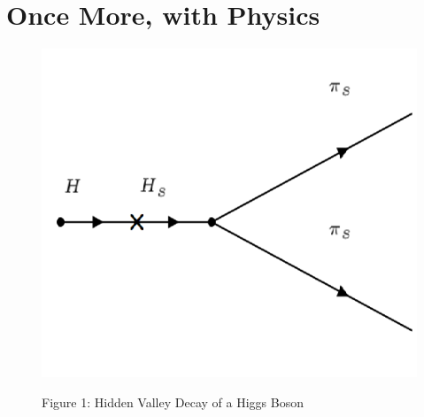 \documentclass[10pt,a4paper]{report}
\begin{document}
\section*{Once More, with Physics}
\begin{figure}
\includegraphics[scale=.4]{Figure1}
\begin{center}
{\scriptsize Figure 1: Hidden Valley Decay of a Higgs Boson}
\end{center}
\end{figure}
\end{document}

